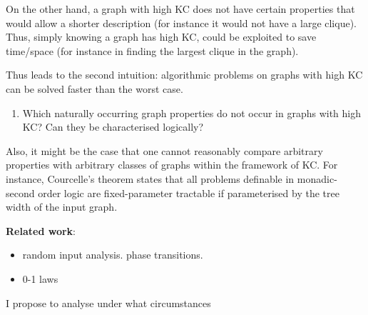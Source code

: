 \documentclass[11pt]{article}
\theoremstyle{plain} \numberwithin{equation}{section}
\theoremstyle{definition}
\begin{document}
On the other hand, a graph with high KC does not have certain properties that would allow a shorter description (for instance it would not have a large clique). Thus, simply knowing a graph has high KC, could be exploited to save time/space (for instance in finding the largest clique in the graph).

Thus leads to the second intuition: algorithmic problems on graphs with high KC can be solved faster than the worst case. 

\begin{enumerate}
\item Which naturally occurring graph properties do not occur in graphs with high KC? Can they be characterised logically?
\end{enumerate}

Also, it might be the case that one cannot reasonably compare arbitrary properties with arbitrary classes of graphs within the framework of KC. For instance, Courcelle's theorem states that all problems definable in monadic-second order logic are fixed-parameter tractable if parameterised by the tree width
of the input graph. 

\noindent
{\bf Related work}: 
\begin{itemize}
\item random input analysis. phase transitions.
\item 0-1 laws
\end{itemize}



I propose to analyse under what circumstances
\end{document}
